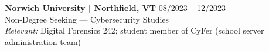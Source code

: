 \noindent
\textbf{Norwich University | Northfield, VT} \hfill 08/2023 -- 12/2023 \\
Non-Degree Seeking --- Cybersecurity Studies \\
\textit{Relevant:} Digital Forensics 242; student member of CyFer (school server administration team)
